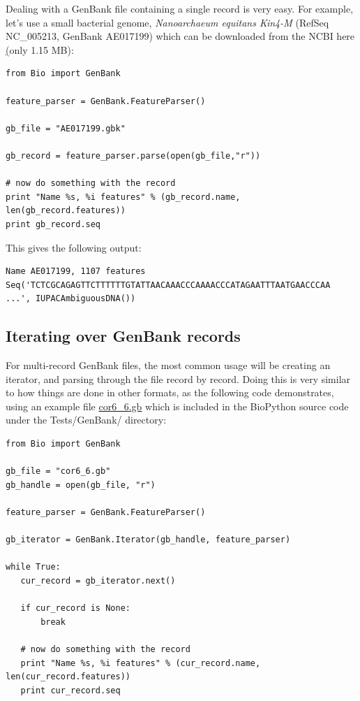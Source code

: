 \documentclass{report}
\begin{document}
Dealing with a GenBank file containing a single record is very easy.  For example, let's use a small bacterial genome, \emph{Nanoarchaeum equitans Kin4-M} (RefSeq NC\_005213, GenBank AE017199) which can be downloaded from the NCBI here \href{ftp://ftp.ncbi.nlm.nih.gov/genbank/genomes/Bacteria/Nanoarchaeum_equitans/AE017199.gbk} (only 1.15 MB):

\begin{verbatim}
from Bio import GenBank

feature_parser = GenBank.FeatureParser()

gb_file = "AE017199.gbk"

gb_record = feature_parser.parse(open(gb_file,"r"))

# now do something with the record
print "Name %s, %i features" % (gb_record.name, len(gb_record.features))
print gb_record.seq
\end{verbatim}

This gives the following output:

\begin{verbatim}
Name AE017199, 1107 features
Seq('TCTCGCAGAGTTCTTTTTTGTATTAACAAACCCAAAACCCATAGAATTTAATGAACCCAA ...', IUPACAmbiguousDNA())
\end{verbatim}

\subsection{Iterating over GenBank records}
\label{sec:gb-parsing-iterator}

For multi-record GenBank files, the most common usage will be creating an iterator, and parsing through the file record by record. Doing this is very similar to how things are done in other formats, as the following code demonstrates, using an example file \href{http://cvs.biopython.org/cgi-bin/viewcvs/viewcvs.cgi/*checkout*/biopython/Tests/GenBank/cor6_6.gb?rev=HEAD&cvsroot=biopython&content-type=text/plain}{cor6\_6.gb} which is included in the BioPython source code under the Tests/GenBank/ directory:

\begin{verbatim}
from Bio import GenBank

gb_file = "cor6_6.gb"
gb_handle = open(gb_file, "r")

feature_parser = GenBank.FeatureParser()

gb_iterator = GenBank.Iterator(gb_handle, feature_parser)

while True:
   cur_record = gb_iterator.next()

   if cur_record is None:
       break

   # now do something with the record
   print "Name %s, %i features" % (cur_record.name, len(cur_record.features))
   print cur_record.seq
\end{verbatim}
\end{document}
